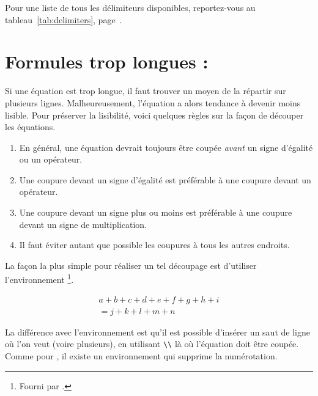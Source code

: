 Pour une liste de tous les délimiteurs disponibles, reportez-vous au
tableau~\ref{tab:delimiters}, page~\pageref{tab:delimiters}.


\section{Formules trop longues : }
\label{sec:multline}


Si une équation est trop longue, il faut trouver un moyen de la répartir sur
plusieurs lignes. Malheureusement, l'équation a alors tendance à devenir moins
lisible. Pour préserver la lisibilité, voici quelques règles sur la façon de
découper les équations.
\begin{enumerate}
  \item En général, une équation devrait toujours être coupée \emph{avant} un
    signe d'égalité ou un opérateur.
  \item Une coupure devant un signe d'égalité est préférable à une coupure
    devant un opérateur.
  \item Une coupure devant un signe \og plus \fg ou moins est préférable à une
    coupure devant un signe de multiplication.
  \item Il faut éviter autant que possible les coupures à tous les autres
    endroits.
\end{enumerate}
La façon la plus simple pour réaliser un tel découpage est d'utiliser
l'environnement \footnote{Fourni par .}.
\begin{example}
\begin{multline}
  a + b + c + d + e + f 
  + g + h + i  
  \\
  = j + k + l + m + n 
\end{multline}
\end{example}
\noindent
La différence avec l'environnement  est qu'il est possible
d'insérer un saut de ligne où l'on veut (voire plusieurs), en utilisant
\verb+\\+ là où l'équation doit être coupée. Comme pour , il
existe un environnement  qui supprime la numérotation.

